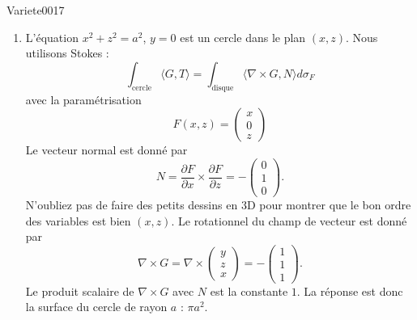 \begin{corrige}{Variete0017}
\begin{enumerate}
		\item
			L'équation $x^2+z^2=a^2$, $y=0$ est un cercle dans le plan $(x,z)$. Nous utilisons Stokes :
			\begin{equation}
				\int_{\text{cercle}}\langle G, T\rangle =\int_{\text{disque}}\langle \nabla\times G, N\rangle d\sigma_F
			\end{equation}
			avec la paramétrisation
			\begin{equation}
				F(x,z)=\begin{pmatrix}
					x	\\ 
					0	\\ 
					z	
				\end{pmatrix}
			\end{equation}
			Le vecteur normal est donné par
			\begin{equation}
				N=\frac{ \partial F }{ \partial x }\times\frac{ \partial F }{ \partial z }=-\begin{pmatrix}
					0	\\ 
					1	\\ 
					0	
				\end{pmatrix}.
			\end{equation}
			N'oubliez pas de faire des petits dessins en 3D pour montrer que le bon ordre des variables est bien $(x,z)$. Le rotationnel du champ de vecteur est donné par
			\begin{equation}
				\nabla\times G=\nabla\times\begin{pmatrix}
					y	\\ 
					z	\\ 
					x	
				\end{pmatrix}=-\begin{pmatrix}
					1	\\ 
					1	\\ 
					1	
				\end{pmatrix}.
			\end{equation}
			Le produit scalaire de $\nabla\times G$ avec $N$ est la constante $1$. La réponse est donc la surface du cercle de rayon $a$ : $\pi a^2$.

	\end{enumerate}
\end{corrige}
